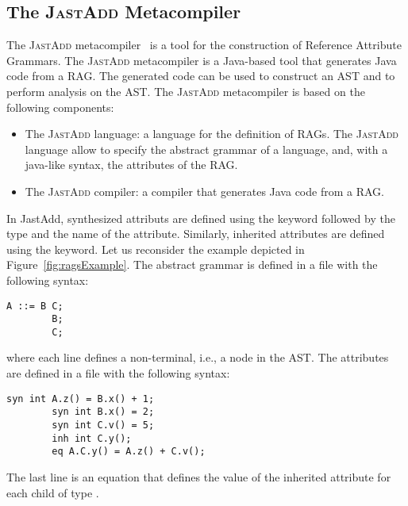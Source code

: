 \subsection{The \textsc{JastAdd} Metacompiler}
\label{sec:jastadd}
The \textsc{JastAdd} metacompiler~\cite{DBLP:journals/entcs/HedinM01} is a tool for the construction of
Reference Attribute Grammars. The \textsc{JastAdd} metacompiler is a Java-based tool that generates
Java code from a RAG. The generated code can be used to construct an AST and to perform
analysis on the AST.
The \textsc{JastAdd} metacompiler is based on the following components:
\begin{itemize}
    \item The \textsc{JastAdd} language: a language for the definition of RAGs.
    The \textsc{JastAdd} language allow to specify the abstract grammar of a language, and,
    with a java-like syntax, the attributes of the RAG.
    \item The \textsc{JastAdd} compiler: a compiler that generates Java code from a RAG.
\end{itemize}
In JastAdd, synthesized attributs are defined using the  keyword followed
by the type and the name of the attribute. Similarly, inherited attributes are defined
using the  keyword. Let us reconsider the example depicted in Figure~\ref{fig:ragsExample}.
The abstract grammar is defined in a  file with the following syntax:
    \begin{lstlisting}[language=JastAdd]
        A ::= B C;
        B;
        C;
    \end{lstlisting}
where each line defines a non-terminal, i.e., a node in the AST.
The attributes are defined in a  file with the following syntax:
    \begin{lstlisting}[language=JastAdd]
        syn int A.z() = B.x() + 1;
        syn int B.x() = 2;
        syn int C.v() = 5;
        inh int C.y();
        eq A.C.y() = A.z() + C.v();
    \end{lstlisting}
The last line is an equation that defines the value of the inherited attribute  for each child of type .
